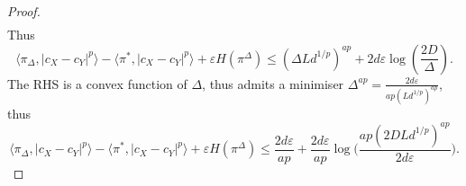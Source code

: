 \begin{proof}
\begin{equation}
\begin{split}
      \end{split}
    \end{equation}
    Thus
    \begin{equation}
      \langle \pi_{\Delta}, \vert c_X - c_Y \vert^p \rangle -
      \langle \pi^*, \vert c_X - c_Y \vert^p \rangle + \varepsilon H(\pi^{\Delta})
      \leq (\Delta Ld^{1/p})^{ap} + 2 d \varepsilon \log(\frac{2D}{\Delta}).
    \end{equation}
    The RHS is a convex function of $\Delta$, thus admits a minimiser
    $\Delta^{ap} = \frac{2d \varepsilon}{ap (Ld^{1/p})^{ap}}$, thus
    \begin{equation}
      \langle \pi_{\Delta}, \vert c_X - c_Y \vert^p \rangle
      - \langle \pi^*, \vert c_X - c_Y \vert^p \rangle + \varepsilon H(\pi^{\Delta})
      \leq \frac{2 d \varepsilon}{ap}
      + \frac{2d \varepsilon}{ap} \log\Big( \frac{ap (2DLd^{1/p})^{ap}}{2d \varepsilon} \Big).
    \end{equation}
\end{proof}

